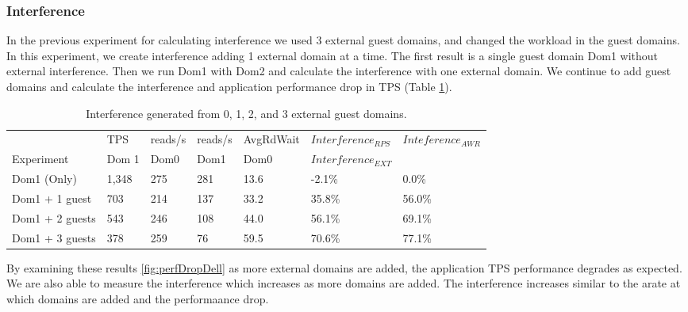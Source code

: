 \subsubsection{Interference}
In the previous experiment for calculating interference we used 3 external guest domains, and changed the workload in the guest domains.  In this experiment, we create interference adding 1 external domain at a time.  The first result is a single guest domain Dom1 without external interference.  Then we run Dom1 with Dom2 and calculate the interference with one external domain.  We continue to add guest domains and calculate the interference and application performance drop in TPS (Table \ref{tab:domains}).

\begin{table}[!h]
\begin{tabular}{ l l l l l l p{9cm} }
                   & TPS   & reads/s & reads/s & AvgRdWait & $Interference_{RPS}$ & $Inteference_{AWR}$ \\
	Experiment     & Dom 1 & Dom0     & Dom1     & Dom0      & $Interference_{EXT}$ &             \\
	\hline
    Dom1 (Only)     &1,348 & 275      & 281      & 13.6     &  -2.1\%  &   0.0\%   \\
    Dom1 + 1 guest  &  703 & 214      & 137      & 33.2     &  35.8\%  &   56.0\%  \\
    Dom1 + 2 guests &  543 & 246      & 108      & 44.0     &  56.1\%  &   69.1\%    \\
    Dom1 + 3 guests &  378 & 259      &  76      & 59.5     &  70.6\%  &   77.1\%  \\
\end{tabular}
\caption{Interference generated from 0, 1, 2, and 3 external guest domains.}
\label{tab:domains}
\end{table}

By examining these results \ref{fig:perfDropDell} as more external domains are added, the application TPS performance degrades as expected.  We are also able to measure the interference which increases as more domains are added.  The interference increases similar to the arate at which domains are added and the performaance drop.

